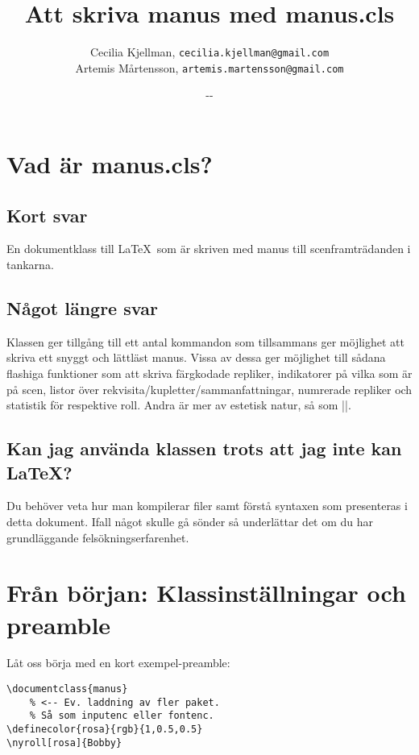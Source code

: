 \documentclass[a4paper,12pt]{article}
\newcommand*{\pack}{\textsf}
\renewcommand{\dateseparator}{-}
\newcommand{\todayiso}{%
	\the\year\dateseparator\twodigit\month\dateseparator\twodigit\day}
\begin{document}
\title{Att skriva manus med \pack{manus.cls}}
\author{%
	Cecilia Kjellman, \texttt{cecilia.kjellman@gmail.com}\\%
	Artemis Mårtensson, \texttt{artemis.martensson@gmail.com}}
\date{\todayiso}
\maketitle



\newpage
\tableofcontents
\newpage



\section{Vad är \pack{manus.cls}?}

\subsection{Kort svar}
En dokumentklass till \LaTeX\ som är skriven med manus till scenframträdanden i tankarna.

\subsection{Något längre svar}
Klassen ger tillgång till ett antal kommandon som tillsammans ger möjlighet att skriva ett snyggt och lättläst manus. Vissa av dessa ger möjlighet till sådana flashiga funktioner som att skriva färgkodade repliker, indikatorer på vilka som är på scen, listor över rekvisita/kupletter/sammanfattningar, numrerade repliker och statistik för respektive roll. Andra är mer av estetisk natur, så som |\akt|. 

\subsection{Kan jag använda klassen trots att jag inte kan \LaTeX?}
Du behöver veta hur man kompilerar filer samt förstå syntaxen som presenteras i detta dokument. Ifall något skulle gå sönder så underlättar det om du har grundläggande felsökningserfarenhet.



\section{Från början: Klassinställningar och preamble}
Låt oss börja med en kort exempel-preamble:

\begin{lstlisting}
\documentclass{manus}
	% <-- Ev. laddning av fler paket.
	% Så som inputenc eller fontenc.
\definecolor{rosa}{rgb}{1,0.5,0.5}
\nyroll[rosa]{Bobby}
\end{lstlisting}
\end{document}
